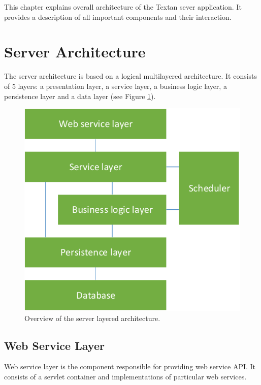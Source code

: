 
This chapter explains overall architecture of the Textan sever application. It provides
a description of all important components and their interaction.

\section{Server Architecture}

The server architecture is based on a logical multilayered architecture. It
consists of 5 layers: a presentation layer, a service layer, a business logic layer, 
a persistence layer and a data layer (see Figure
\ref{fig:ServerComponentOverview}).

\begin{figure}[!htb]
        \centering
        \includegraphics{Images/ServerComponentOverview}
        \caption{Overview of the server layered architecture.}
        \label{fig:ServerComponentOverview}
\end{figure}

\subsection{Web Service Layer}
Web service layer is the component responsible for providing web service
API. It consists of a servlet container and implementations of particular
web services.

